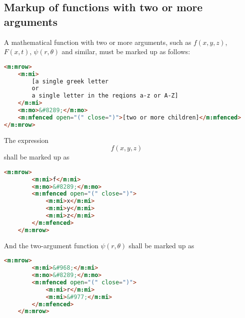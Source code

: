 \documentclass[english,a4paper,11pt]{article}
\begin{document}
\subsection{Markup of functions with two or more arguments}
A mathematical function with two or more arguments, such as $f(x,y,z)$, $F(x,t)$, $\psi (r, \theta )$ and similar, must be marked up as follows:
\begin{lstlisting}[language=HTML]
<m:mrow>
	<m:mi>
		[a single greek letter 
		or 
		a single letter in the reqions a-z or A-Z]
	</m:mi>
	<m:mo>&#8289;</m:mo>
	<m:mfenced open="(" close=")">[two or more children]</m:mfenced>
</m:mrow>
\end{lstlisting}


\begin{eksempler}
	The expression 
	\begin{equation}f(x,y,z)\end{equation}
	shall be marked up as
	\begin{lstlisting}[language=HTML]
	<m:mrow>
		<m:mi>f</m:mi>
		<m:mo>&#8289;</m:mo>
		<m:mfenced open="(" close=")">
			<m:mi>x</m:mi>
			<m:mi>y</m:mi>
			<m:mi>z</m:mi>
		</m:mfenced>
	</m:mrow>
	\end{lstlisting}
	
	And the two-argument function 
	$\psi (r, \theta )$
	shall be marked up as
	\begin{lstlisting}[language=HTML]
	<m:mrow>
		<m:mi>&#968;</m:mi>
		<m:mo>&#8289;</m:mo>
		<m:mfenced open="(" close=")">
			<m:mi>r</m:mi>
			<m:mi>&#977;</m:mi>
		</m:mfenced>
	</m:mrow>
	\end{lstlisting}
\end{eksempler}
\end{document}
